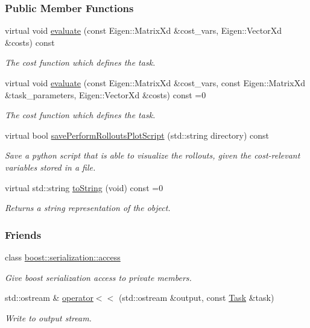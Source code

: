 \subsubsection*{Public Member Functions}
\begin{DoxyCompactItemize}
\item 
virtual void \hyperlink{classDmpBbo_1_1Task_a473ecda5052be4eb800d51699ec34eeb}{evaluate} (const Eigen\+::\+Matrix\+Xd \&cost\+\_\+vars, Eigen\+::\+Vector\+Xd \&costs) const 
\begin{DoxyCompactList}\small\item\em The cost function which defines the task. \end{DoxyCompactList}\item 
virtual void \hyperlink{classDmpBbo_1_1Task_a6534c0378bdfa540946ce2a02c914417}{evaluate} (const Eigen\+::\+Matrix\+Xd \&cost\+\_\+vars, const Eigen\+::\+Matrix\+Xd \&task\+\_\+parameters, Eigen\+::\+Vector\+Xd \&costs) const =0
\begin{DoxyCompactList}\small\item\em The cost function which defines the task. \end{DoxyCompactList}\item 
virtual bool \hyperlink{classDmpBbo_1_1Task_aed72bdbcdd0ed6359fa863b5a057adb7}{save\+Perform\+Rollouts\+Plot\+Script} (std\+::string directory) const 
\begin{DoxyCompactList}\small\item\em Save a python script that is able to visualize the rollouts, given the cost-\/relevant variables stored in a file. \end{DoxyCompactList}\item 
virtual std\+::string \hyperlink{classDmpBbo_1_1Task_af084bff2ddd6233e9a898faa23f6195c}{to\+String} (void) const =0
\begin{DoxyCompactList}\small\item\em Returns a string representation of the object. \end{DoxyCompactList}\end{DoxyCompactItemize}
\subsubsection*{Friends}
\begin{DoxyCompactItemize}
\item 
class \hyperlink{classDmpBbo_1_1Task_ac98d07dd8f7b70e16ccb9a01abf56b9c}{boost\+::serialization\+::access}
\begin{DoxyCompactList}\small\item\em Give boost serialization access to private members. \end{DoxyCompactList}\item 
std\+::ostream \& \hyperlink{classDmpBbo_1_1Task_aeb28524e35e48b815debf14f2cbe4543}{operator$<$$<$} (std\+::ostream \&output, const \hyperlink{classDmpBbo_1_1Task}{Task} \&task)
\begin{DoxyCompactList}\small\item\em Write to output stream. \end{DoxyCompactList}\end{DoxyCompactItemize}



